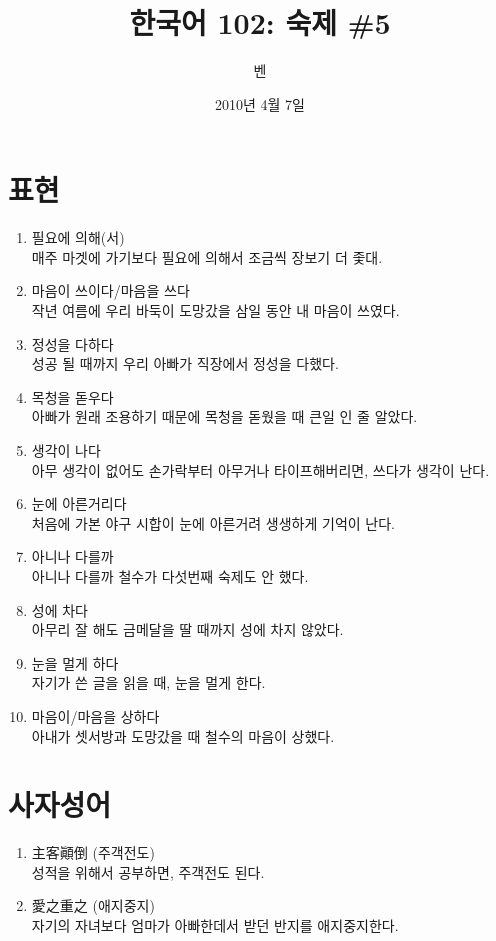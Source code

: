 \documentclass[11pt]{article}
\title{한국어 102: 숙제 \#5}
\author{벤}
\date{2010년 4월 7일}
\begin{document}
\maketitle
\thispagestyle{empty}
\pagestyle{empty}

\section{표현}
\begin{enumerate}
\item 필요에 의해(서) \\
  매주 마겟에 가기보다 필요에 의해서 조금씩 장보기 더 좇대.
\item 마음이 쓰이다/마음을 쓰다 \\
  작년 여름에 우리 바둑이 도망갔을 삼일 동안 내 마음이 쓰였다.
\item 정성을 다하다 \\
  성공 될 때까지 우리 아빠가 직장에서 정성을 다했다.
\item 목청을 돋우다 \\
  아빠가 원래 조용하기 때문에 목청을 돋웠을 때 큰일 인 줄 알았다.
\item 생각이 나다 \\
  아무 생각이 없어도 손가락부터 아무거나 타이프해버리면, 쓰다가 생각이 난다.
\item 눈에 아른거리다 \\
  처음에 가본 야구 시합이 눈에 아른거려 생생하게 기억이 난다.
\item 아니나 다를까 \\
  아니나 다를까 철수가 다섯번째 숙제도 안 했다.
\item 성에 차다 \\
  아무리 잘 해도 금메달을 딸 때까지 성에 차지 않았다.
\item 눈을 멀게 하다 \\
  자기가 쓴 글을 읽을 때, 눈을 멀게 한다.
\item 마음이/마음을 상하다 \\
  아내가 셋서방과 도망갔을 때 철수의 마음이 상했다.
\end{enumerate}

\section{사자성어}
\begin{enumerate}
\item 主客顚倒 (주객전도) \\
  성적을 위해서 공부하면, 주객전도 된다.
\item 愛之重之 (애지중지) \\
  자기의 자녀보다 엄마가 아빠한데서 받던 반지를 애지중지한다.
\end{enumerate}
\end{document}
